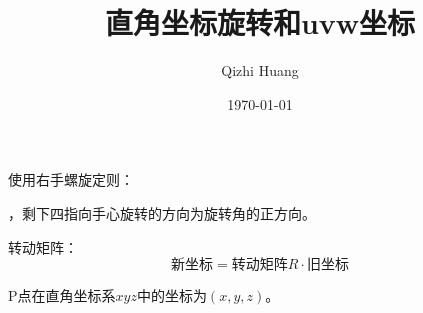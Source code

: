 \documentclass[11pt, a4paper]{article}  %
\begin{document}
\begin{CJK}{UTF8}{gbsn}  %
\nocite{*}
\setlength{\parskip}{6pt}  %
\setlength{\baselineskip}{20pt} %





\title{\huge 直角坐标旋转和uvw坐标 \bf }

\author{Qizhi Huang}
\date{\today}
\maketitle


使用右手螺旋定则：

\indent{}，剩下四指向手心旋转的方向为旋转角的正方向。 

转动矩阵：
\begin{equation}
	\text{新坐标} = \text{转动矩阵}R \cdot \text{旧坐标}
\end{equation} 

P点在直角坐标系$xyz$中的坐标为$(x,y,z)$。 


\end{CJK}
\end{document}
